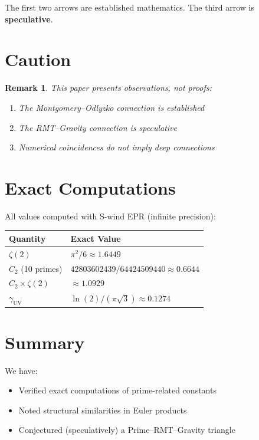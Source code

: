\documentclass[11pt,a4paper]{article}
\newtheorem{remark}{Remark}
\begin{document}
The first two arrows are established mathematics. The third arrow is \textbf{speculative}.

\section{Caution}

\begin{remark}
This paper presents observations, not proofs:
\begin{enumerate}
    \item The Montgomery--Odlyzko connection is established
    \item The RMT--Gravity connection is speculative
    \item Numerical coincidences do not imply deep connections
\end{enumerate}
\end{remark}

\section{Exact Computations}

All values computed with S-wind EPR (infinite precision):

\begin{center}
\begin{tabular}{|l|l|}
\hline
Quantity & Exact Value \\
\hline
$\zeta(2)$ & $\pi^2/6 \approx 1.6449$ \\
$C_2$ (10 primes) & $42803602439/64424509440 \approx 0.6644$ \\
$C_2 \times \zeta(2)$ & $\approx 1.0929$ \\
$\gamma_{\text{UV}}$ & $\ln(2)/(\pi\sqrt{3}) \approx 0.1274$ \\
\hline
\end{tabular}
\end{center}

\section{Summary}

We have:
\begin{itemize}
    \item Verified exact computations of prime-related constants
    \item Noted structural similarities in Euler products
    \item Conjectured (speculatively) a Prime--RMT--Gravity triangle
\end{itemize}
\end{document}
